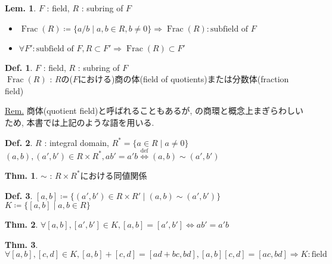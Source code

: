 \documentclass[uplatex,dvipdfmx,9pt]{beamer}
\newcommand{\defarrow}{\overset{\mathrm{def}}{\Leftrightarrow}}
\newcommand{\Frac}[1]{\operatorname{Frac}(#1)}
\newcounter{textLemCount}
\theoremstyle{definition} %
\newtheorem{defn}{Def.}[subsection] %
\newtheorem{thm}{Thm.}[subsection] %
\newtheorem{lemText}[textLemCount]{Lem.} %
\theoremstyle{example}
\begin{document}
    \begin{frame}

      \begin{lemText}
        $F$ : field, $R$ : subring of $F$
        \begin{itemize}
          \item $\Frac{R} \coloneqq \{a/b \mid a,b \in R, b \neq 0\} \Rightarrow \Frac{R} : \text{subfield of $F$}$ 
          \item $\forall F' : \text{subfield of $F$}, R \subset F' \Rightarrow \Frac{R} \subset F'$
        \end{itemize}
      \end{lemText}

      \begin{defn}
        $F$ : field, $R$ : subring of $F$ \\
        $\Frac{R}$ : $R$の($F$における)\alert{商の体(field of quotients)}または\alert{分数体(fraction field)}
      \end{defn}
      \underline{Rem.} 商体(quotient field)と呼ばれることもあるが,  の商環と概念上まぎらわしいため, 本書では上記のような語を用いる.
      
    \end{frame}

    \begin{frame}

      \begin{defn}
        $R$ : integral domain, $R^* = \{ a \in R \mid a \neq 0\}$ \\
        $(a, b), (a', b') \in R \times R^*, ab' = a'b \defarrow (a, b) \sim (a', b')$
      \end{defn}

      \begin{thm}
        $\sim$ : $R \times R^*$における同値関係
      \end{thm}

      \begin{defn}
        $[a, b] \coloneqq \{(a', b') \in R \times R' \mid (a, b) \sim (a', b')\}$ \\
        $K \coloneqq \{[a, b] \mid a, b \in R\}$
      \end{defn}

      \begin{thm}
        $\forall [a, b], [a', b'] \in K, [a, b] = [a', b'] \Leftrightarrow ab' = a'b$
      \end{thm}

      \begin{thm}
        $\forall [a, b], [c, d] \in K, [a, b] + [c, d] = [ad + bc, bd], [a, b][c, d] = [ac, bd] \Rightarrow K : \text{field}$
      \end{thm}
      
    \end{frame}
\end{document}
